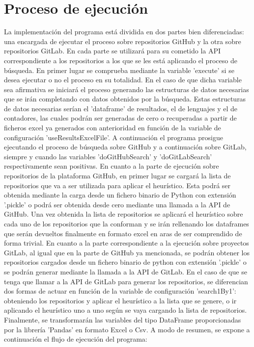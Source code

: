 \section{Proceso de ejecución}
La implementación del programa está dividida en dos partes bien diferenciadas: una encargada de ejecutar el proceso sobre repositorios GitHub y la otra sobre repositorios GitLab. En cada parte se utilizará para su cometido la API correspondiente a los repositorios a los que se les está aplicando el proceso de búsqueda.
En primer lugar se comprueba mediante la variable 'execute' si se desea ejecutar o no el proceso en su totalidad. En el caso de que dicha variable sea afirmativa se iniciará el proceso generando las estructuras de datos necesarias que se irán completando con datos obtenidos por la búsqueda. 
Estas estructuras de datos necesarias serían el 'dataframe' de resultados, el de lenguajes y el de contadores, las cuales podrán ser generadas de cero o recuperadas a partir de ficheros excel ya generados con anterioridad en función de la variable de configuración 'useResultsExcelFile'.
A continuación el programa prosigue ejecutando el proceso de búsqueda sobre GitHub y a continuación sobre GitLab, siempre y cuando las variables 'doGitHubSearch' y 'doGitLabSearch' respectivamente sean positivas.
En cuanto a la parte de ejecución sobre repositorios de la plataforma GitHub, en primer lugar se cargará la lista de repositorios que va a ser utilizada para aplicar el heurístico. Esta podrá ser obtenida mediante la carga desde un fichero binario de Python con extensión '.pickle' o podrá ser obtenida desde cero mediante una llamada a la API de GitHub.
Una vez obtenida la lista de repositorios se aplicará el heurístico sobre cada uno de los repositorios que la conforman y se irán rellenando los dataframes que serán devueltos finalmente en formato excel en aras de ser comprendido de forma trivial.
En cuanto a la parte correspondiente a la ejecución sobre proyectos GitLab, al igual que en la parte de GitHub ya mencionada, se podrán obtener los repositorios cargados desde un fichero binario de python con extensión '.pickle' o se podrán generar mediante la llamada a la API de GitLab. En el caso de que se tenga que llamar a la API de GitLab para generar los repositorios, se diferencian dos formas de actuar en función de la variable de configuración 'search1By1': obteniendo los repositorios y aplicar el heurístico a la lista que se genere, o ir aplicando el heurístico uno a uno según se vaya cargando la lista de repositorios.
Finalmente, se transformarán las variables del tipo DataFrame proporcionadas por la librería 'Pandas' en formato Excel o Csv.
A modo de resumen, se expone a continuación el flujo de ejecución del programa:

